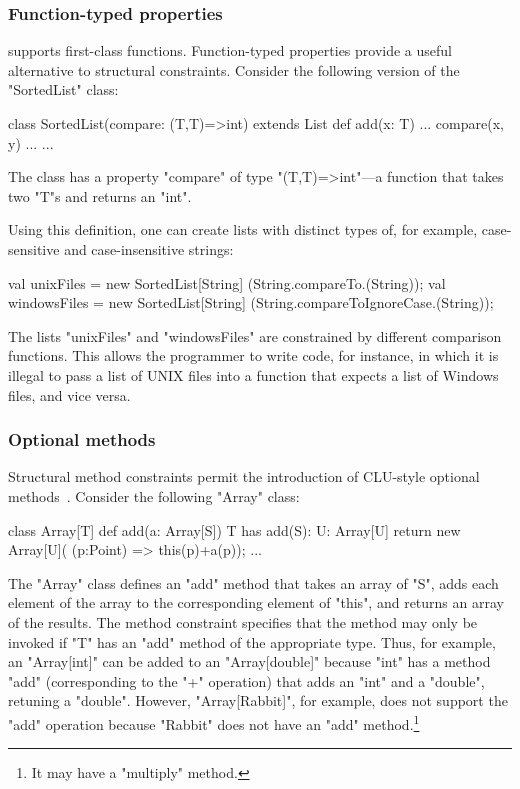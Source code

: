 \subsubsection{Function-typed properties}

\Xten{} supports first-class functions.
Function-typed properties provide a useful alternative to
structural constraints.
Consider the following version of the
\xcd"SortedList" class:
{
\begin{xten}
class SortedList(compare: (T,T)=>int)
  extends List {
    def add(x: T) { ... compare(x, y) ... }
    ...
}
\end{xten}}
\noindent
The class has a property \xcd"compare" of type
\xcd"(T,T)=>int"---a function that takes two \xcd"T"s and
returns an \xcd"int".  

Using this definition, one can create lists with distinct types
of, for example, case-sensitive and case-insensitive strings:
{
\begin{xten}
val unixFiles
  = new SortedList[String]
      (String.compareTo.(String));
val windowsFiles
  = new SortedList[String]
      (String.compareToIgnoreCase.(String));
\end{xten}}

\noindent
The lists \xcd"unixFiles" and \xcd"windowsFiles" are constrained
by different comparison functions.  This allows the programmer
to write code, for instance, in which it is illegal to pass a list of UNIX
files into a function that expects a list of Windows files, and
vice versa.

\subsubsection{Optional methods}

Structural method constraints permit the introduction of
CLU-style optional methods~\cite{clu}.  Consider the following
\xcd"Array" class:
{
\begin{xten}
class Array[T] {
  def add(a: Array[S])
    {T has add(S): U}: Array[U] {
    return new Array[U](
      (p:Point) => this(p)+a(p));
  }
  ...
}
\end{xten}}

\noindent
The \xcd"Array" class defines an \xcd"add" method that takes 
an array of \xcd"S", adds each element of the array to the
corresponding element of \xcd"this", and returns an array of the
results.  The method constraint specifies that the method may
only be invoked if \xcd"T" has an \xcd"add" method of the
appropriate type.  Thus, for example, an \xcd"Array[int]"
can be added to an \xcd"Array[double]" because \xcd"int"
has a method \xcd"add" (corresponding to the \xcd"+" operation)
that adds an \xcd"int" and a \xcd"double", retuning a
\xcd"double".  However, \xcd"Array[Rabbit]", for example, does not support
the \xcd"add" operation because \xcd"Rabbit" does not have an
\xcd"add" method.\footnote{It may have a \xcd"multiply" method.}




